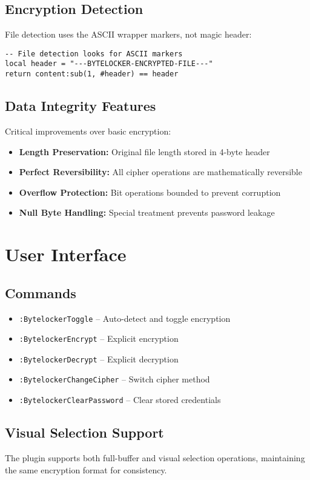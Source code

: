 \documentclass[11pt,a4paper]{article}
\begin{document}
\begin{multicols}{2}
\subsection{Encryption Detection}
File detection uses the ASCII wrapper markers, not magic header:
\begin{lstlisting}[basicstyle=\ttfamily\tiny]
-- File detection looks for ASCII markers
local header = "---BYTELOCKER-ENCRYPTED-FILE---"
return content:sub(1, #header) == header
\end{lstlisting}

\subsection{Data Integrity Features}
Critical improvements over basic encryption:
\begin{itemize}
    \item \textbf{Length Preservation:} Original file length stored in 4-byte header
    \item \textbf{Perfect Reversibility:} All cipher operations are mathematically reversible
    \item \textbf{Overflow Protection:} Bit operations bounded to prevent corruption
    \item \textbf{Null Byte Handling:} Special treatment prevents password leakage
\end{itemize}

\section{User Interface}

\subsection{Commands}
\begin{itemize}
    \item \texttt{:BytelockerToggle} -- Auto-detect and toggle encryption
    \item \texttt{:BytelockerEncrypt} -- Explicit encryption
    \item \texttt{:BytelockerDecrypt} -- Explicit decryption
    \item \texttt{:BytelockerChangeCipher} -- Switch cipher method
    \item \texttt{:BytelockerClearPassword} -- Clear stored credentials
\end{itemize}

\subsection{Visual Selection Support}
The plugin supports both full-buffer and visual selection operations, maintaining the same encryption format for consistency.


\end{multicols}
\end{document}
